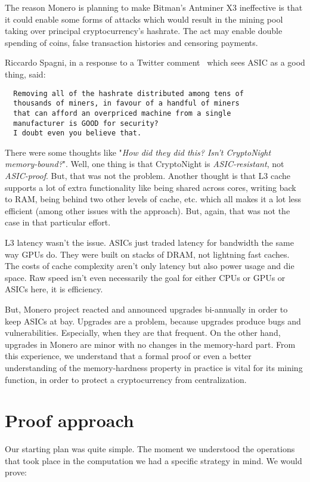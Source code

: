 The reason Monero is planning to make Bitman’s Antminer X3 ineffective is that it could enable some forms of attacks which would result in the mining pool taking over principal cryptocurrency’s hashrate. The act may enable double spending of coins, false transaction histories and censoring payments.

Riccardo Spagni, in a response to a Twitter comment~\cite{fluffypony} which sees ASIC as a good thing, said:
\begin{verbatim}
  Removing all of the hashrate distributed among tens of
  thousands of miners, in favour of a handful of miners
  that can afford an overpriced machine from a single
  manufacturer is GOOD for security?
  I doubt even you believe that.
\end{verbatim}

There were some thoughts like "\emph{How did they did this? Isn't CryptoNight memory-bound?}". Well, one thing is that CryptoNight is \emph{ASIC-resistant}, not \emph{ASIC-proof}. But, that was not the problem. Another thought is that L3 cache supports a lot of extra functionality like being shared across cores, writing back to RAM, being behind two other levels of cache, etc. which all makes it a lot less efficient (among other issues with the approach). But, again, that was not the case in that particular effort.

L3 latency wasn't the issue. ASICs just traded latency for bandwidth the same way GPUs do. They were built on stacks of DRAM, not lightning fast caches. The costs of cache complexity aren't only latency but also power usage and die space. Raw speed isn't even necessarily the goal for either CPUs or GPUs or ASICs here, it is efficiency.

But, Monero project reacted and announced upgrades bi-annually in order to keep ASICs at bay. Upgrades are a problem, because upgrades produce bugs and vulnerabilities. Especially, when they are that frequent. On the other hand, upgrades in Monero are minor with no changes in the memory-hard part. From this experience, we understand that a formal proof or even a better understanding of the memory-hardness property in practice is vital for its mining function, in order to protect a cryptocurrency from centralization.

\section{Proof approach}
%
Our starting plan was quite simple. The moment we understood the operations that took place in the computation we had a specific strategy in mind. We would prove:

